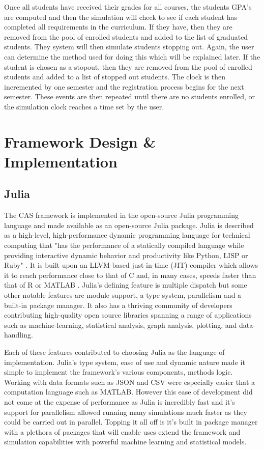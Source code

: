 \documentclass[botnum, fleqn]{unmeethesis}
\begin{document}
  Once all students have received their grades for all courses, the students GPA's are computed and then the simulation will check to see if each student has completed all requirements in the curriculum. If they have, then they are removed from the pool of enrolled students and added to the list of graduated students. They system will then simulate students stopping out. Again, the user can determine the method used for doing this which will be explained later. If the student is chosen as a stopout, then they are removed from the pool of enrolled students and added to a list of stopped out students. The clock is then incremented by one semester and the registration process begins for the next semester. These events are then repeated until there are no students enrolled, or the simulation clock reaches a time set by the user.


\chapter{Framework Design \& Implementation}

  \section{Julia}
    The CAS framework is implemented in the open-source Julia programming language and made available as an open-source Julia package. Julia is described as a high-level, high-performance dynamic programming language for technical computing that "has the performance of a statically compiled language while providing interactive dynamic behavior and productivity like Python, LISP or Ruby" \cite{Julia}. It is built upon an LLVM-based just-in-time (JIT) compiler which allows it to reach performance close to that of C and, in many cases, speeds faster than that of R or MATLAB \cite{Julia}. Julia's defining feature is multiple dispatch but some other notable features are module support, a type system, parallelism and a built-in package manager. It also has a thriving community of developers contributing high-quality open source libraries spanning a range of applications such as machine-learning, statistical analysis, graph analysis, plotting, and data-handling.

    Each of these features contributed to choosing Julia as the language of implementation. Julia's type system, ease of use and dynamic nature made it simple to implement the framework's various components, methods logic. Working with data formats such as JSON and CSV were especially easier that a computation language such as MATLAB. However this ease of development did not come at the expense of performance as Julia is incredibly fast and it's support for parallelism allowed running many simulations much faster as they could be carried out in parallel. Topping it all off is it's built in package manager with a plethora of packages that will enable uses extend the framework and simulation capabilities with powerful machine learning and statistical models.
\end{document}
